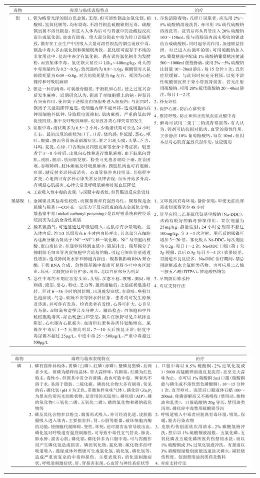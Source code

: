 \begin{longtable}{c}
 \includegraphics[width=\textwidth,height=\textheight,keepaspectratio]{./images/Image00220.jpg}\\
 \includegraphics[width=\textwidth,height=\textheight,keepaspectratio]{./images/Image00221.jpg}
 \end{longtable}

